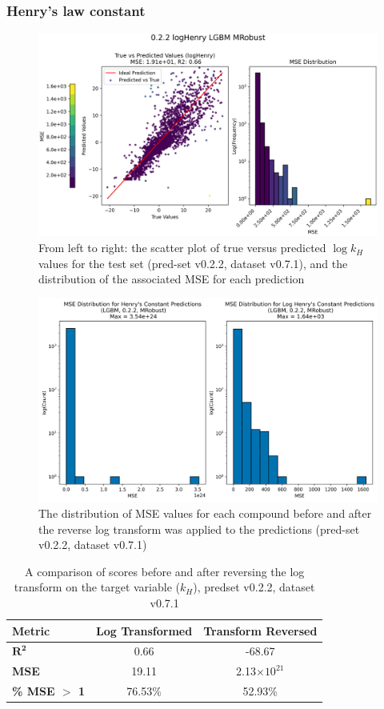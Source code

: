 \documentclass[11pt, titlepage]{article}
\begin{document}
\subsubsection{Henry's law constant}
\begin{figure}[H]
	\centering
	\small
	\includegraphics[width=0.8\linewidth]{figures/0.2.2-PredLogH.png}
	\caption{From left to right: the scatter plot of true versus predicted $\log k_H$ values for the test set (pred-set v0.2.2, dataset v0.7.1), and the distribution of the associated MSE for each prediction}
	\label{fig:PredLogH}
\end{figure}

\begin{figure}[H]
	\centering
	\small
	\includegraphics[width=0.8\linewidth]{figures/kH_MSE.png}
	\caption{The distribution of MSE values for each compound before and after the reverse log transform was applied to the predictions (pred-set v0.2.2, dataset v0.7.1)}
	\label{fig:kH_MSE}
\end{figure}

\begin{table}[H]
	\centering
	\small
	\begin{tabular}{|l|cc|}
		\hline
		\textbf{Metric} & \textbf{Log Transformed} & \textbf{Transform Reversed} \\
		\hline
		$\mathbf{R^2}$ & 0.66 & -68.67\\
		\textbf{MSE} & 19.11 & 2.13$\times10^{21}$ \\
		\textbf{\% MSE $>$ 1} & 76.53\% & 52.93\% \\
		\hline
	\end{tabular}
	\caption{A comparison of scores before and after reversing the log transform on the target variable ($k_H$), predset v0.2.2, dataset v0.7.1}
	\label{tab:kHScoreComparison}
\end{table}
\end{document}

